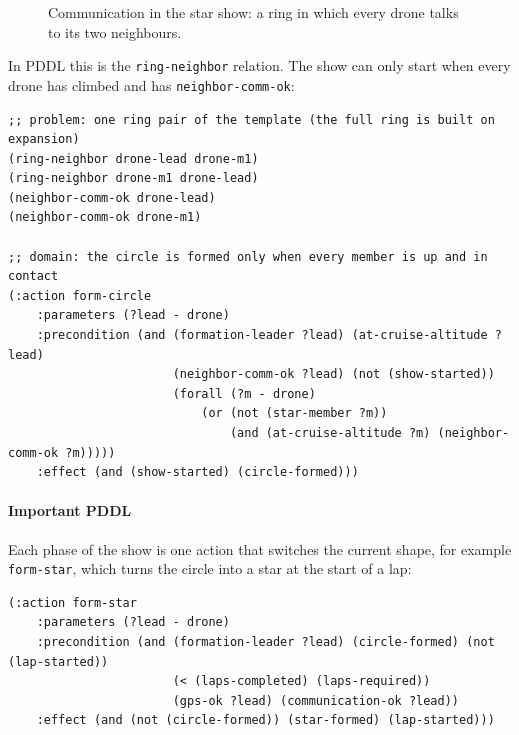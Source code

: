 \documentclass[11pt,a4paper,oneside]{report}
\newcommand{\code}[1]{\texttt{#1}}
\begin{document}
\begin{figure}[H]
\centering
{}
\caption[Communication in the star show]{Communication in the star show: a ring in which every
drone talks to its two neighbours.}
\label{fig:comm-star}
\end{figure}

\noindent In PDDL this is the \code{ring-neighbor} relation. The show can only start when every
drone has climbed and has \code{neighbor-comm-ok}:

\begin{lstlisting}
;; problem: one ring pair of the template (the full ring is built on expansion)
(ring-neighbor drone-lead drone-m1)
(ring-neighbor drone-m1 drone-lead)
(neighbor-comm-ok drone-lead)
(neighbor-comm-ok drone-m1)

;; domain: the circle is formed only when every member is up and in contact
(:action form-circle
    :parameters (?lead - drone)
    :precondition (and (formation-leader ?lead) (at-cruise-altitude ?lead)
                       (neighbor-comm-ok ?lead) (not (show-started))
                       (forall (?m - drone)
                           (or (not (star-member ?m))
                               (and (at-cruise-altitude ?m) (neighbor-comm-ok ?m)))))
    :effect (and (show-started) (circle-formed)))
\end{lstlisting}

\paragraph{Important PDDL}
Each phase of the show is one action that switches the current shape, for example
\code{form-star}, which turns the circle into a star at the start of a lap:

\begin{lstlisting}
(:action form-star
    :parameters (?lead - drone)
    :precondition (and (formation-leader ?lead) (circle-formed) (not (lap-started))
                       (< (laps-completed) (laps-required))
                       (gps-ok ?lead) (communication-ok ?lead))
    :effect (and (not (circle-formed)) (star-formed) (lap-started)))
\end{lstlisting}
\end{document}

